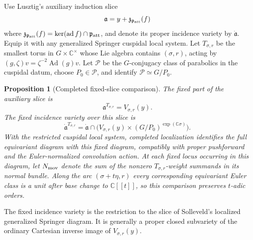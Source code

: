 \documentclass[11pt]{amsart}
\newtheorem{proposition}[theorem]{Proposition}
\theoremstyle{definition}
\theoremstyle{remark}
\begin{document}
Use Lusztig's auxiliary induction slice
\[
 \mathfrak a=y+\mathfrak z_{\mathfrak p_{\rm att}}(f)
\]
where
$\mathfrak z_{\mathfrak p_{\rm att}}(f)=
\ker(\operatorname{ad}f)\cap\mathfrak p_{\rm att}$, and denote its proper
incidence variety by $\dot{\mathfrak a}$.  Equip it
with any generalized Springer cuspidal local system.  Let $T_{\sigma,r}$ be
the smallest torus in $G\times\mathbb C^\times$
whose Lie algebra contains $(\sigma,r)$, acting by
$(g,\zeta)v=\zeta^{-2}\operatorname{Ad}(g)v$.
Let $\mathcal P$ be the $G$-conjugacy class of parabolics in the cuspidal
datum, choose $P_0\in\mathcal P$, and identify $\mathcal P\simeq G/P_0$.

\begin{proposition}[Completed fixed-slice comparison]
\label{prop:general-fixed-slice}
The fixed part of the auxiliary slice is
\begin{equation}\label{eq:general-fixed-slice}
 \mathfrak a^{T_{\sigma,r}}=V_{\sigma,r}(y).
\end{equation}
The fixed incidence
variety over this slice is
\[
 \dot{\mathfrak a}^{T_{\sigma,r}}
 =\dot{\mathfrak a}\cap
 \bigl(V_{\sigma,r}(y)\times(G/P_0)^{\exp(\mathbb C\sigma)}\bigr).
\]
With the restricted cuspidal local system, completed localization identifies
the full equivariant diagram
with this fixed diagram, compatibly with proper pushforward and the
Euler-normalized convolution action.  At each fixed locus occurring in this diagram, let
$N_{\rm mov}$ denote the sum of the nonzero $T_{\sigma,r}$-weight summands in
its normal bundle.  Along the arc $(\sigma+t\eta,r)$ every corresponding
equivariant Euler class is a unit after base change to $\mathbb C[[t]]$, so
this comparison preserves $t$-adic orders.
\end{proposition}

The fixed incidence variety is the restriction to the slice of Solleveld's
localized generalized Springer diagram.  It is generally a proper closed
subvariety of the ordinary Cartesian inverse image of
$V_{\sigma,r}(y)$.
\end{document}
